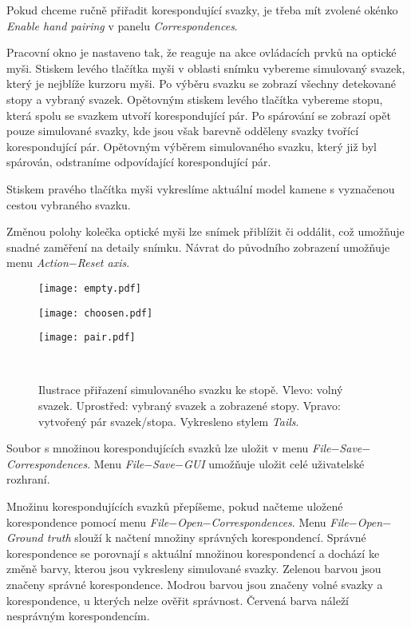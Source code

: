 
Pokud chceme ručně přiřadit korespondující svazky, je třeba mít zvolené okénko \textit{Enable hand pairing} v panelu \textit{Correspondences}.

Pracovní okno je nastaveno tak, že reaguje na akce ovládacích prvků na optické myši. Stiskem levého tlačítka myši v oblasti snímku vybereme simulovaný svazek, který je nejblíže kurzoru myši. Po výběru svazku se zobrazí všechny detekované stopy a vybraný svazek. Opětovným stiskem levého tlačítka vybereme stopu, která spolu se svazkem utvoří korespondující pár. Po spárování se zobrazí opět pouze simulované svazky, kde jsou však barevně odděleny svazky tvořící korespondující pár. Opětovným výběrem simulovaného svazku, který již byl spárován, odstraníme odpovídající korespondující pár. 

Stiskem pravého tlačítka myši vykreslíme aktuální model kamene s vyznačenou cestou vybraného svazku.

Změnou polohy kolečka optické myši lze snímek přiblížit či oddálit, což umožňuje snadné zaměření na detaily snímku. Návrat do původního zobrazení umožňuje menu \textit{Action}$-$\textit{Reset axis}.

\begin{figure}[h!]
   \centering
   \begin{minipage}[c]{0.3\textwidth}
     \centering \texttt{[image: empty.pdf]} 
   \end{minipage}
   \begin{minipage}[c]{0.3\textwidth}
     \centering \texttt{[image: choosen.pdf]} 
   \end{minipage}
   \begin{minipage}[c]{0.3\textwidth}
     \centering \texttt{[image: pair.pdf]}
   \end{minipage}
   \\
   \caption[Ilustrace přiřazení simulovaného svazku ke stopě.]{Ilustrace přiřazení simulovaného svazku ke stopě. Vlevo: volný svazek. Uprostřed: vybraný svazek a zobrazené stopy. Vpravo: vytvořený pár svazek/stopa. Vykresleno stylem \textit{Tails}.}
   
\end{figure}


Soubor s množinou korespondujících svazků lze uložit v menu \textit{File}$-$\textit{Save}$-$\textit{Correspondences}. Menu \textit{File}$-$\textit{Save}$-$\textit{GUI} umožňuje uložit celé uživatelské rozhraní. 

Množinu korespondujících svazků přepíšeme, pokud načteme uložené korespondence pomocí menu \textit{File}$-$\textit{Open}$-$\textit{Correspondences}. Menu \textit{File}$-$\textit{Open}$-$\textit{Ground truth} slouží k načtení množiny správných korespondencí. Správné korespondence se porovnají s aktuální množinou korespondencí a dochází ke změně barvy, kterou jsou vykresleny simulované svazky. Zelenou barvou jsou značeny správné korespondence. Modrou barvou jsou značeny volné svazky a korespondence, u kterých nelze ověřit správnost. Červená barva náleží nesprávným korespondencím.  

